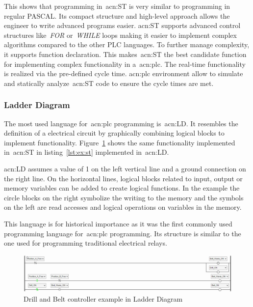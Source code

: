 This shows that programming in~\acrshort{acn:ST} is very similar to programming in regular PASCAL.
Its compact structure and high-level approach allows the engineer to write advanced programs easier.
\acrshort{acn:ST} supports advanced control structures like~\textit{FOR} or~\textit{WHILE} loops making it easier to implement complex algorithms compared to the other PLC languages. 
To further manage complexity, it supports function declaration.
This makes~\acrshort{acn:ST} the best candidate function for implementing complex functionality in a~\acrshort{acn:plc}.
The real-time functionality is realized via the pre-defined cycle time.
\acrshort{acn:plc} environment allow to simulate and statically analyze~\acrshort{acn:ST} code to ensure the cycle times are met.

\subsubsection{Ladder Diagram}

The most used language for~\acrshort{acn:plc} programming is~\acrfull{acn:LD}.
It resembles the definition of a electrical circuit by graphically combining logical blocks to implement functionality.
Figure~\ref{fig:drill:ld} shows the same functionality implemented in~\acrshort{acn:ST} in listing~\ref{lst:ex:st} implemented in~\acrshort{acn:LD}.

\acrshort{acn:LD} assumes a value of 1 on the left vertical line and a ground connection on the right line.
On the horizontal lines, logical blocks related to input, output or memory variables can be added to create logical functions.
In the example the circle blocks on the right symbolize the writing to the memory and the symbols on the left are read accesses and logical operations on variables in the memory.

This language is for historical importance as it was the first commonly used programming language for~\acrshort{acn:plc} programming.
Its structure is similar to the one used for programming traditional electrical relays.

\begin{figure}
	\includegraphics[width=\textwidth]{Figures/belt_drill_ld.png}
	\caption[Drill and Belt controller example in Ladder Diagram]{Drill and Belt controller example in Ladder Diagram}
	\label{fig:drill:ld}
\end{figure}